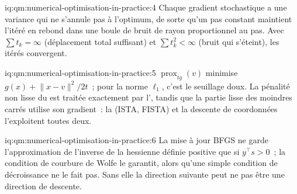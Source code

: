 \begin{solution}{iq:qm:numerical-optimisation-in-practice:4}
Chaque gradient stochastique a une variance qui ne s'annule pas à l'optimum, de sorte qu'un pas constant maintient l'itéré en rebond dans une boule de bruit de rayon proportionnel au pas. Avec $\sum t_k = \infty$
(déplacement total suffisant) et $\sum t_k^2 < \infty$ (bruit qui s'éteint), les itérés convergent.
\end{solution}

\begin{solution}{iq:qm:numerical-optimisation-in-practice:5}
$\operatorname{prox}_{tg}(v)$ minimise $g(x) + \lVert x - v\rVert^2/2t$~; pour la norme $\ell_1$, c'est le seuillage doux. La pénalité non lisse du  est traitée exactement par l', tandis que la partie lisse
des moindres carrés utilise son gradient~: la  (ISTA, FISTA) et la descente de coordonnées l'exploitent toutes deux.
\end{solution}

\begin{solution}{iq:qm:numerical-optimisation-in-practice:6}
La mise à jour BFGS ne garde l'approximation de l'inverse de la hessienne définie positive que si $y^\top s > 0$~; la condition de courbure de Wolfe le garantit, alors qu'une simple condition de décroissance ne le fait pas. Sans elle
la direction suivante peut ne pas être une direction de descente.
\end{solution}
